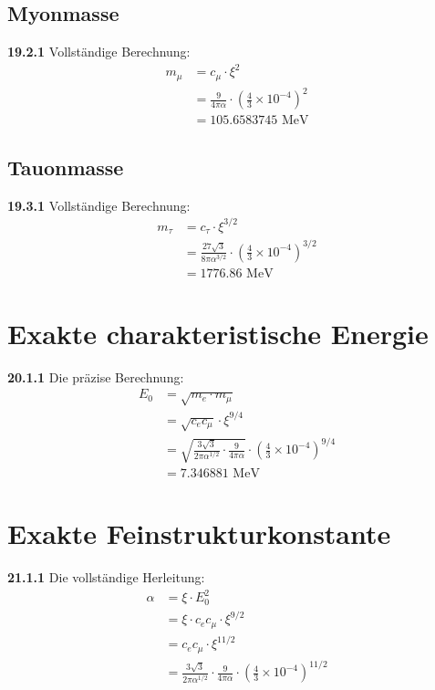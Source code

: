 \documentclass[12pt,a4paper]{article}
\begin{document}
\subsection{Myonmasse}
\noindent \textbf{19.2.1} Vollständige Berechnung:
\begin{align}
	m_\mu &= c_\mu \cdot \xi^2 \\
	&= \frac{9}{4\pi\alpha} \cdot \left(\frac{4}{3} \times 10^{-4}\right)^2 \\
	&= 105.6583745 \text{ MeV}
\end{align}

\subsection{Tauonmasse}
\noindent \textbf{19.3.1} Vollständige Berechnung:
\begin{align}
	m_\tau &= c_\tau \cdot \xi^{3/2} \\
	&= \frac{27\sqrt{3}}{8\pi\alpha^{3/2}} \cdot \left(\frac{4}{3} \times 10^{-4}\right)^{3/2} \\
	&= 1776.86 \text{ MeV}
\end{align}

	
\section{Exakte charakteristische Energie}
\noindent \textbf{20.1.1} Die präzise Berechnung:
\begin{align}
	E_0 &= \sqrt{m_e \cdot m_\mu} \\
	&= \sqrt{c_e c_\mu} \cdot \xi^{9/4} \\
	&= \sqrt{\frac{3\sqrt{3}}{2\pi\alpha^{1/2}} \cdot \frac{9}{4\pi\alpha}} \cdot \left(\frac{4}{3} \times 10^{-4}\right)^{9/4} \\
	&= 7.346881 \text{ MeV}
\end{align}

\section{Exakte Feinstrukturkonstante}
\noindent \textbf{21.1.1} Die vollständige Herleitung:
\begin{align}
	\alpha &= \xi \cdot E_0^2 \\
	&= \xi \cdot c_e c_\mu \cdot \xi^{9/2} \\
	&= c_e c_\mu \cdot \xi^{11/2} \\
	&= \frac{3\sqrt{3}}{2\pi\alpha^{1/2}} \cdot \frac{9}{4\pi\alpha} \cdot \left(\frac{4}{3} \times 10^{-4}\right)^{11/2}
\end{align}
\end{document}
